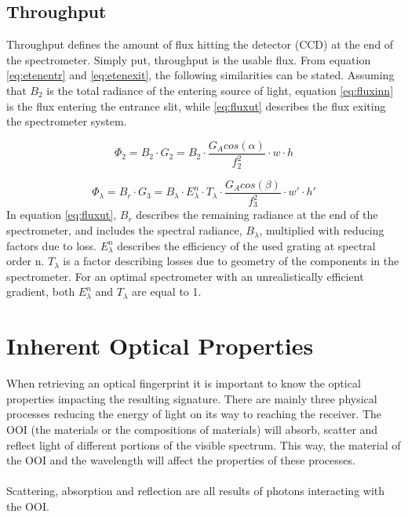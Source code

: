 \subsection{Throughput}
Throughput defines the amount of flux hitting the detector (CCD) at the end of the spectrometer. Simply put, throughput is the usable flux. From equation \ref{eq:etenentr} and \ref{eq:etenexit}, the following similarities can be stated. Assuming that $B_2$ is the total radiance of the entering source of light, equation \ref{eq:fluxinn} is the flux entering the entrance slit, while \ref{eq:fluxut} describes the flux exiting the spectrometer system. 

\begin{equation}
    \Phi_2 = B_2 \cdot G_2 = B_2 \cdot \frac{G_A cos(\alpha)}{f_2^2} \cdot w \cdot h
    \label{eq:fluxinn}
\end{equation}

\begin{equation}
    \Phi_{\lambda} = B_{r} \cdot G_3 = B_{\lambda}\cdot E_{\lambda}^n \cdot T_{\lambda} \cdot \frac{G_A cos(\beta)}{f_3^2} \cdot w' \cdot h'
    \label{eq:fluxut}
\end{equation}
\noindent
In equation \ref{eq:fluxut}, $B_{r}$ describes the remaining radiance at the end of the spectrometer, and includes the spectral radiance, $B_{\lambda}$,  multiplied with reducing factors due to loss. $E_{\lambda}^n$ describes the efficiency of the used grating at spectral order n. $T_{\lambda}$ is a factor describing losses due to geometry of the components in the spectrometer. For an optimal spectrometer with an unrealistically efficient gradient, both $E_{\lambda}^n$ and $T_{\lambda}$ are equal to 1.


\vspace{1.3cm}
\section{Inherent Optical Properties}
When retrieving an optical fingerprint it is important to know the optical properties impacting the resulting signature. There are mainly three physical processes reducing the energy of light on its way to reaching the receiver. The OOI (the materials or the compositions of materials) will absorb, scatter and reflect light of different portions of the visible spectrum. This way, the material of the OOI and the wavelength will affect the properties of these processes. 
\\\\
Scattering, absorption and reflection are all results of photons interacting with the OOI. 
